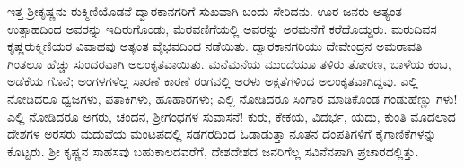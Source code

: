 ಇತ್ತ ಶ್ರೀಕೃಷ್ಣನು ರುಕ್ಮಿಣಿಯೊಡನೆ ದ್ವಾರಕಾನಗರಿಗೆ ಸುಖವಾಗಿ ಬಂದು ಸೇರಿದನು. ಊರ ಜನರು ಅತ್ಯಂತ ಉತ್ಸಾಹದಿಂದ ಅವರನ್ನು ಇದಿರುಗೊಂಡು, ಮೆರವಣಿಗೆಯಲ್ಲಿ ಅವರನ್ನು ಅರಮನೆಗೆ ಕರೆದೊಯ್ದರು. ಮರುದಿವಸ ಕೃಷ್ಣರುಕ್ಮಿಣಿಯರ ವಿವಾಹವು ಅತ್ಯಂತ ವೈಭವದಿಂದ ನಡೆಯಿತು. ದ್ವಾರಕಾನಗರಿಯು ದೇವೇಂದ್ರನ ಅಮರಾವತಿ ಗಿಂತಲೂ ಹೆಚ್ಚು ಸುಂದರವಾಗಿ ಅಲಂಕೃತವಾಯಿತು. ಮನೆಮನೆಯ ಮುಂದೆಯೂ ತಳಿರು ತೋರಣ, ಬಾಳೆಯ ಕಂಬ, ಅಡೆಕೆಯ ಗೊನೆ; ಅಂಗಳಗಳೆಲ್ಲ ಸಾರಣೆ ಕಾರಣೆ ರಂಗವಲ್ಲಿ ಅರಳು ಅಕ್ಷತೆಗಳಿಂದ ಅಲಂಕೃತವಾಗಿದ್ದವು. ಎಲ್ಲಿ ನೋಡಿದರೂ ಧ್ವಜಗಳು, ಪತಾಕಿಗಳು, ಹೂಹಾರಗಳು; ಎಲ್ಲಿ ನೋಡಿದರೂ ಸಿಂಗಾರ ಮಾಡಿಕೊಂಡ ಗಂಡುಹೆಣ್ಣು ಗಳು! ಎಲ್ಲಿ ನೋಡಿದರೂ ಅಗರು, ಚಂದನ, ಶ್ರೀಗಂಧಗಳ ಸುವಾಸನೆ! ಕುರು, ಕೇಕಯ, ವಿದರ್ಭ, ಯದು, ಕುಂತಿ ಮೊದಲಾದ ದೇಶಗಳ ಅರಸರು ಮದುವೆಯ ಮಂಟಪದಲ್ಲಿ ಸಡಗರದಿಂದ ಓಡಾಡುತ್ತಾ ನೂತನ ದಂಪತಿಗಳಿಗೆ ಕೈಗಾಣಿಕೆಗಳನ್ನು ಕೊಟ್ಟರು. ಶ್ರೀ ಕೃಷ್ಣನ ಸಾಹಸವು ಬಹುಕಾಲದವರೆಗೆ, ದೇಶದೇಶದ ಜನರಿಗೆಲ್ಲ ಸವಿನೆನಪಾಗಿ ಪ್ರಚಾರದಲ್ಲಿತ್ತು.

